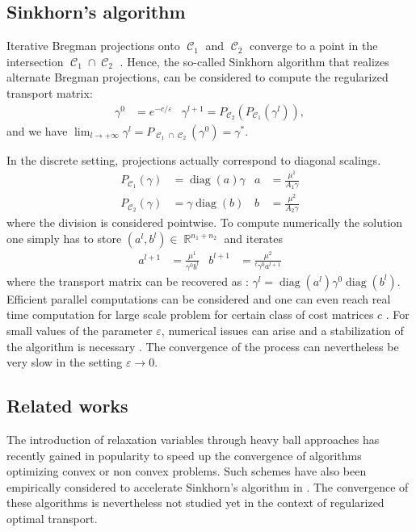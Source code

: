 \documentclass{article} %
\DeclareMathOperator{\IR}{\mathbb{R}}
\DeclareMathOperator{\Ccal}{\mathcal{C}}
\DeclareMathOperator{\diag}{diag}
\renewcommand{\epsilon}{\varepsilon}
\theoremstyle{plain}
\theoremstyle{definition}
\theoremstyle{remark}
\begin{document}
\subsection{Sinkhorn's algorithm}
Iterative Bregman projections onto $\Ccal_1$ and $\Ccal_2$ converge to a point in the intersection $\Ccal_1 \cap \Ccal_2$ \cite{bregman67}. Hence, the so-called Sinkhorn algorithm \cite{sinkhorn64} that realizes alternate Bregman projections, can be considered to compute the regularized  transport matrix:
\begin{align*}
\gamma^0 &= e^{-c/\epsilon} &
\gamma^{l+1} = P_{\Ccal_2}(P_{\Ccal_1}(\gamma^l)),
\end{align*}
and we have 
$\lim_{l\rightarrow +\infty} \gamma^l = P_{\Ccal_1 \cap \Ccal_2}(\gamma^0) = \gamma^*.$

In the discrete setting,  projections actually correspond to diagonal scalings.
\begin{align}\label{scaling}
P_{\Ccal_1}(\gamma) &= \diag(a) \gamma &
a &=  \frac{\mu^1}{A_1 \gamma} \\
P_{\Ccal_2}(\gamma) &= \gamma \diag(b) &
b &= \frac{\mu^2}{A_2 \gamma}\nonumber
\end{align}
where the division is considered pointwise. 
To compute numerically the solution  one simply has to store $(a^l, b^l)\in\IR^{n_1+n_2}$ and iterates
\begin{align*}
a^{l+1} &= \frac{\mu^1}{\gamma^0 b^l} &
b^{l+1} &= \frac{\mu^2}{^t \gamma^0 a^{l+1}} 
\end{align*}
where the transport matrix can be recovered as :
$\gamma^l = \diag(a^l) \gamma^0 \diag(b^l).$ 
Efficient parallel computations can be considered \cite{cuturi13} and one can even reach real time computation for large scale problem for certain class of cost matrices $c$ \cite{Solomon2015}. 
For small values of the parameter $\epsilon$, numerical issues can arise and a stabilization of the algorithm is necessary \cite{2016arXiv160705816C}.
The convergence of the process can nevertheless be very slow  in the setting $\epsilon\to 0$.
\subsection{Related works }
The introduction of relaxation variables through heavy ball approaches \cite{POLYAK19641} has recently gained in popularity  to speed up the convergence of algorithms optimizing convex \cite{2014arXiv1412.7457G} or non convex \cite{Zavriev1993,2016arXiv160609070O} problems. Such schemes have also been empirically considered to accelerate Sinkhorn's algorithm  in \cite{peyre2016quantum,2017arXiv170801955S}. The convergence of these algorithms is nevertheless not studied yet in the context of regularized optimal transport.
\end{document}
